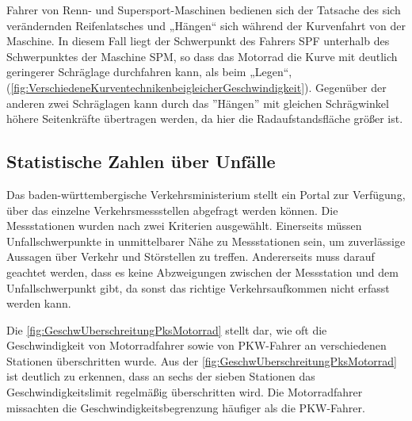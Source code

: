 Fahrer von Renn- und Supersport-Maschinen bedienen sich der Tatsache des sich verändernden Reifenlatsches und „Hängen“ sich während der Kurvenfahrt von der Maschine. In diesem Fall liegt der Schwerpunkt des Fahrers SPF unterhalb des Schwerpunktes der Maschine SPM, so dass das Motorrad die Kurve mit deutlich geringerer Schräglage durchfahren kann, als beim „Legen“, (\autoref{fig:VerschiedeneKurventechnikenbeigleicherGeschwindigkeit}). Gegenüber der anderen zwei Schräglagen kann durch das ''Hängen'' mit gleichen Schrägwinkel höhere Seitenkräfte übertragen werden, da hier die Radaufstandsfläche größer ist.


\subsection{Statistische Zahlen über Unfälle}
Das baden-württembergische Verkehrsministerium stellt ein Portal zur Verfügung, über das einzelne Verkehrsmessstellen abgefragt werden können. Die Messstationen wurden nach zwei Kriterien ausgewählt. Einerseits müssen Unfallschwerpunkte in unmittelbarer Nähe zu Messstationen sein, um zuverlässige Aussagen über Verkehr und Störstellen zu treffen.
Andererseits muss darauf geachtet werden, dass es keine Abzweigungen zwischen der Messstation und dem Unfallschwerpunkt gibt, da sonst das richtige Verkehrsaufkommen nicht erfasst werden kann.

Die \autoref{fig:GeschwUberschreitungPksMotorrad} stellt dar, wie oft die Geschwindigkeit von Motorradfahrer sowie von PKW-Fahrer an verschiedenen Stationen überschritten wurde. Aus der \autoref{fig:GeschwUberschreitungPksMotorrad} ist deutlich zu erkennen, dass an sechs der sieben Stationen das Geschwindigkeitslimit regelmäßig überschritten wird.
Die Motorradfahrer missachten die Geschwindigkeitsbegrenzung häufiger als die PKW-Fahrer. \cite{Maire2020}


